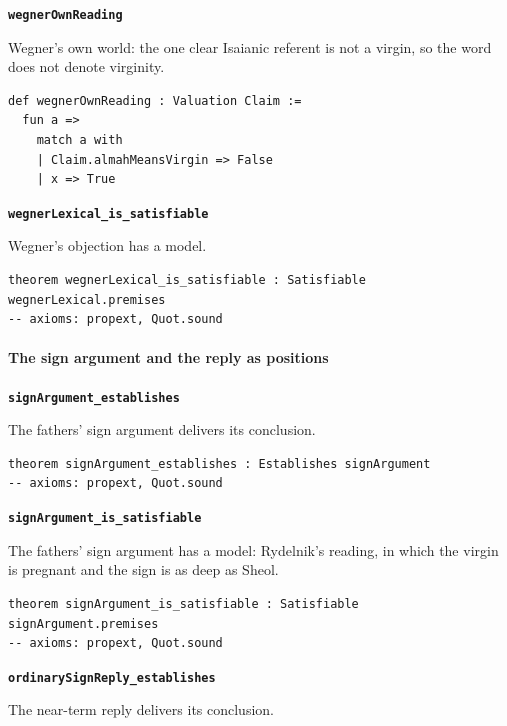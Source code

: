 \documentclass[11pt]{article}
\begin{document}
\par\medskip\noindent\textbf{\texttt{wegner\allowbreak{}Own\allowbreak{}Reading}}\par\nobreak\noindent
Wegner’s own world: the one clear Isaianic referent is not a virgin, so the word does not denote virginity.

{\small\begin{verbatim}
def wegnerOwnReading : Valuation Claim :=
  fun a =>
    match a with
    | Claim.almahMeansVirgin => False
    | x => True
\end{verbatim}}
\par\medskip\noindent\textbf{\texttt{wegner\allowbreak{}Lexical\_\allowbreak{}is\_\allowbreak{}satisfiable}}\par\nobreak\noindent
Wegner’s objection has a model.

{\small\begin{verbatim}
theorem wegnerLexical_is_satisfiable : Satisfiable wegnerLexical.premises
-- axioms: propext, Quot.sound
\end{verbatim}}
\paragraph*{The sign argument and the reply as positions}
\leavevmode\par\nobreak
\par\medskip\noindent\textbf{\texttt{sign\allowbreak{}Argument\_\allowbreak{}establishes}}\par\nobreak\noindent
The fathers’ sign argument delivers its conclusion.

{\small\begin{verbatim}
theorem signArgument_establishes : Establishes signArgument
-- axioms: propext, Quot.sound
\end{verbatim}}
\par\medskip\noindent\textbf{\texttt{sign\allowbreak{}Argument\_\allowbreak{}is\_\allowbreak{}satisfiable}}\par\nobreak\noindent
The fathers’ sign argument has a model: Rydelnik’s reading, in which the virgin is pregnant and the sign is as deep as Sheol.

{\small\begin{verbatim}
theorem signArgument_is_satisfiable : Satisfiable signArgument.premises
-- axioms: propext, Quot.sound
\end{verbatim}}
\par\medskip\noindent\textbf{\texttt{ordinary\allowbreak{}Sign\allowbreak{}Reply\_\allowbreak{}establishes}}\par\nobreak\noindent
The near-term reply delivers its conclusion.
\end{document}
